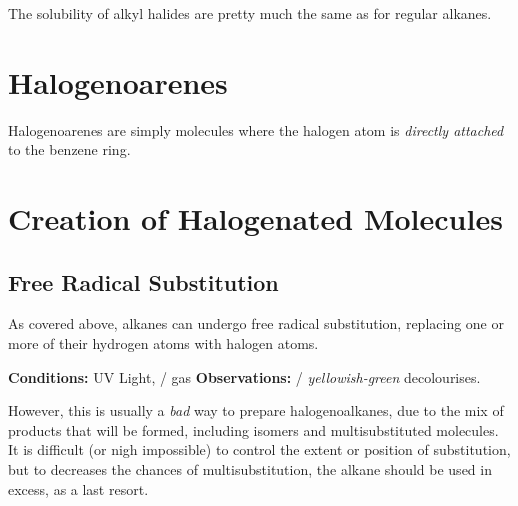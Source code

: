 			The solubility of alkyl halides are pretty much the same as for regular alkanes.



	\pagebreak
	\section{Halogenoarenes}

		Halogenoarenes are simply molecules where the halogen atom is \textit{directly attached} to the benzene ring.





	\section{Creation of Halogenated Molecules}

		\subsection{Free Radical Substitution}

			As covered above, alkanes can undergo free radical substitution, replacing one or more of their hydrogen atoms with halogen
			atoms.

			\vspace{1.5em}

			\vbox{\textbf{Conditions:} \tabto{35mm}UV Light,  /  gas}
			\vbox{\textbf{Observations:} \tabto{35mm}  / \textit{\color{YellowGreen}yellowish-green}  decolourises.}


			However, this is usually a \textit{bad} way to prepare halogenoalkanes, due to the mix of products that will be formed, including
			isomers and multisubstituted molecules. It is difficult (or nigh impossible) to control the extent or position of substitution,
			but to decreases the chances of multisubstitution, the alkane should be used in excess, as a last resort.

